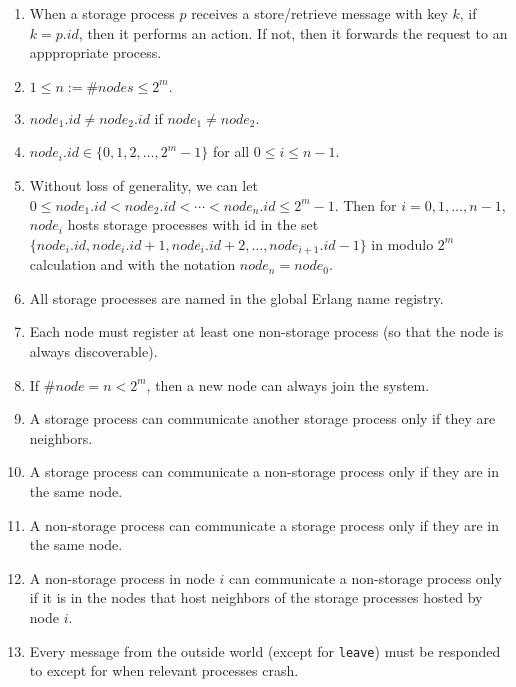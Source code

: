 \documentclass[11pt]{article}
\begin{document}
\begin{enumerate}[S1]
\item When a storage process $p$ receives a store/retrieve message with key $k$, if $k = p.id$, then it performs an action. If not, then it forwards the request to an apppropriate process.

\item $1 \leq n:= \#nodes \leq 2^m.$

\item $node_1.id \neq node_2.id$ if $node_1 \neq node_2.$

\item $node_i.id \in \{0,1,2,\ldots, 2^m - 1\}$ for all $0\leq i \leq n - 1.$ 

\item Without loss of generality, we can let
$0 \leq node_1.id < node_2.id < \cdots < node_n.id \leq 2^m - 1.$
Then for $i= 0, 1, \ldots, n - 1,$ $node_i$ hosts storage processes with id in the set $\{node_i.id, node_i.id + 1, node_i.id + 2, \ldots, node_{i+1}.id - 1\}$ in modulo $2^m$ calculation and with the notation $node_{n} = node_0.$

\item All storage processes are named in the global Erlang name registry.

\item Each node must register at least one non-storage process (so that the node is always discoverable).


\item If $\#node = n < 2^m$, then a new node can always join the system.

\item A storage process can communicate another storage process only if they are neighbors.

\item  A storage process can communicate a non-storage process only if they are in the same node.

\item A non-storage process can communicate a storage process only if they are in the same node.

\item  A non-storage process in node $i$ can communicate a non-storage process only if it is in the nodes that host neighbors of the storage processes hosted by node $i$.

\item Every message from the outside world (except for \texttt{leave}) must be responded to except for when relevant processes crash.
\end{enumerate}
\end{document}
